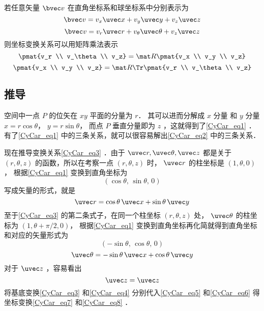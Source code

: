 若任意矢量 $\bvec v$ 在直角坐标系和球坐标系中分别表示为
\begin{equation}\label{CyCar_eq6}
\bvec v = v_x \uvec x + v_y \uvec y + v_z \uvec z
\end{equation}
\begin{equation}\label{CyCar_eq5}
\bvec v = v_r \uvec r + v_\theta \uvec \theta + v_z \uvec z
\end{equation}
则坐标变换关系可以用矩阵乘法表示
\begin{equation}\label{CyCar_eq8}
\pmat{v_r \\ v_\theta \\ v_z}
= \mat R \pmat{v_x \\ v_y \\ v_z}
\end{equation}
\begin{equation}\label{CyCar_eq7}
\pmat{v_x \\ v_y \\ v_z}
= \mat R\Tr \pmat{v_r \\ v_\theta \\ v_z}
\end{equation}
\subsection{推导}
空间中一点 $P$ 的位矢在 $xy$ 平面的分量为 $r$． 其可以进而分解成 $x$ 分量 和 $y$ 分量  $x = r\cos \theta$，  $y = r\sin \theta$， 而点 $P$ 垂直分量即为 $z$ ，这就得到了\autoref{CyCar_eq1} ．有了\autoref{CyCar_eq1} 中的三条关系，就可以很容易解出\autoref{CyCar_eq2} 中的三条关系．

现在推导变换关系\autoref{CyCar_eq3} ．由于 $\uvec r,\uvec \theta ,\uvec z $ 都是关于 $(r, \theta, z)$ 的函数，所以在考察一点 $(r, \theta, z)$ 时， $\uvec r$ 的柱坐标是 $(1, \theta, 0)$，  根据\autoref{CyCar_eq1} 变换到直角坐标为
\begin{equation}
(\cos \theta,\,\sin \theta,\,0)
\end{equation}
写成矢量的形式，就是
 \begin{equation}
\uvec r = \cos \theta \,\uvec x + \sin \theta \,\uvec y 
\end{equation}
至于\autoref{CyCar_eq3} 的第二条式子，在同一个柱坐标 $(r,\theta ,z)$ 处， $\uvec \theta $ 的柱坐标为 $(1, \theta + \pi /2, 0)$， 根据\autoref{CyCar_eq1} 变换到直角坐标再化简就得到直角坐标和对应的矢量形式为
\begin{equation}
(-\sin \theta ,\,\cos \theta , \,0)
\end{equation}
\begin{equation}
\uvec \theta  = -\sin \theta  \,\uvec x + \cos \theta \,\uvec y
\end{equation}
对于 $\uvec z$ ，容易看出
\begin{equation}
\uvec z = \uvec z
\end{equation}
将基底变换\autoref{CyCar_eq3}  和\autoref{CyCar_eq4} 分别代入\autoref{CyCar_eq5}  和\autoref{CyCar_eq6} 得坐标变换\autoref{CyCar_eq7} 和\autoref{CyCar_eq8} ．
